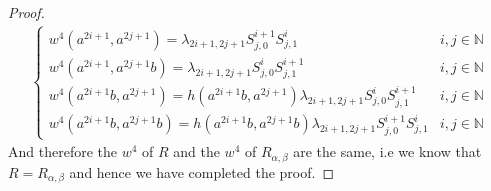 \documentclass[a4paper,11pt]{amsart}
\numberwithin{equation}{section}
\newtheorem{proposition}[theorem]{Proposition}
\begin{document}
\begin{proof}
\begin{gather*}
\left\{
\begin{array}{ll}
w^4(a^{2i+1},a^{2j+1})=\lambda_{2i+1,2j+1}S_{j,0}^{i+1}S_{j,1}^{i}  & {i,j\in \mathbb{N}}\\
w^4(a^{2i+1},a^{2j+1}b)=\lambda_{2i+1,2j+1}S_{j,0}^{i}S_{j,1}^{i+1} & {i,j\in \mathbb{N}}\\
w^4(a^{2i+1}b,a^{2j+1})=h(a^{2i+1}b,a^{2j+1})\lambda_{2i+1,2j+1}S_{j,0}^{i}S_{j,1}^{i+1} & {i,j\in \mathbb{N}}\\
w^4(a^{2i+1}b,a^{2j+1}b)=h(a^{2i+1}b,a^{2j+1}b)\lambda_{2i+1,2j+1}S_{j,0}^{i+1}S_{j,1}^{i}  & {i,j\in \mathbb{N}}
\end{array} \right.
\end{gather*}
And therefore the $w^4$ of $R$ and the $w^4$ of $R_{\alpha,\beta}$ are the same, i.e we know that $R=R_{\alpha,\beta}$ and hence we have completed the proof.
\fi
\end{proof}


%
\end{document}
